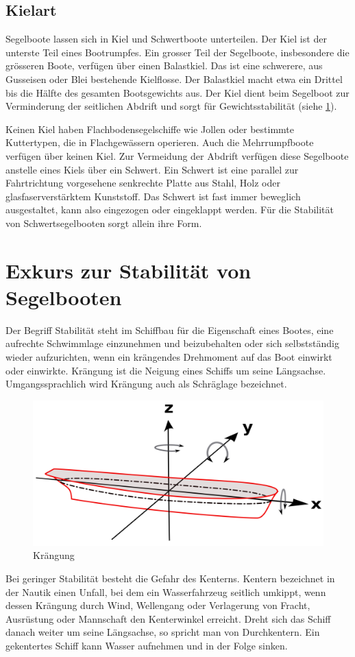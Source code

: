 \subsection{Kielart}
Segelboote lassen sich in Kiel und Schwertboote unterteilen. Der Kiel ist der unterste Teil eines Bootrumpfes. Ein grosser Teil der Segelboote, insbesondere die grösseren Boote, verfügen über einen Balastkiel. Das ist eine schwerere, aus Gusseisen oder Blei bestehende Kielflosse. Der Balastkiel macht etwa ein Drittel bis die Hälfte des gesamten Bootsgewichts aus. Der Kiel dient beim Segelboot zur Verminderung der seitlichen Abdrift und sorgt für Gewichtsstabilität (siehe \ref{subchap:exkurs}).

Keinen Kiel haben Flachbodensegelschiffe wie Jollen oder bestimmte Kuttertypen, die in Flachgewässern operieren. Auch die Mehrrumpfboote verfügen über keinen Kiel. Zur Vermeidung der Abdrift verfügen diese Segelboote anstelle eines Kiels über ein Schwert. Ein Schwert ist eine parallel zur Fahrtrichtung vorgesehene senkrechte Platte aus Stahl, Holz oder glasfaserverstärktem Kunststoff. Das Schwert ist fast immer beweglich ausgestaltet, kann also eingezogen oder eingeklappt werden. Für die Stabilität von Schwertsegelbooten sorgt allein ihre Form.
\section{Exkurs zur Stabilität von Segelbooten}
\label{subchap:exkurs}
Der Begriff Stabilität steht im Schiffbau für die Eigenschaft eines Bootes, eine aufrechte Schwimmlage einzunehmen und beizubehalten oder sich selbstständig wieder aufzurichten, wenn ein krängendes Drehmoment auf das Boot einwirkt oder einwirkte. Krängung ist die Neigung eines Schiffs um seine Längsachse. \cite{noauthor_stabilitat_2023}  Umgangssprachlich wird Krängung auch als Schräglage bezeichnet.
\begin{figure}[H]
    \centering
    \includegraphics[width=0.75\linewidth]{assets/Achsen_Schiffsbewegung.svg.png}
    \caption{Krängung}
    \label{fig:enter-label}
\end{figure}
Bei  geringer Stabilität besteht die Gefahr des Kenterns. Kentern bezeichnet in der Nautik einen Unfall, bei dem ein Wasserfahrzeug seitlich umkippt, wenn dessen Krängung durch Wind, Wellengang oder Verlagerung von Fracht, Ausrüstung oder Mannschaft den Kenterwinkel erreicht. Dreht sich das Schiff danach weiter um seine Längsachse, so spricht man von Durchkentern. Ein gekentertes Schiff kann Wasser aufnehmen und in der Folge sinken.  

